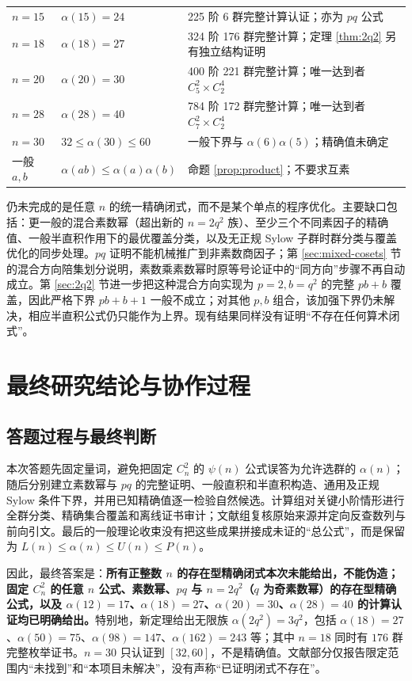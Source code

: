 \documentclass[11pt,a4paper]{article}
\numberwithin{equation}{section}
\theoremstyle{plain}
\theoremstyle{definition}
\theoremstyle{remark}
\begin{document}
\begin{center}
\begin{longtable}{p{}p{}p{}}
$n=15$ & $\alpha(15)=24$ & 225 阶 6 群完整计算认证；亦为 $pq$ 公式\\
$n=18$ & $\alpha(18)=27$ & 324 阶 176 群完整计算；定理 \ref{thm:2q2} 另有独立结构证明\\
$n=20$ & $\alpha(20)=30$ & 400 阶 221 群完整计算；唯一达到者 $C_5^2\times C_2^4$\\
$n=28$ & $\alpha(28)=40$ & 784 阶 172 群完整计算；唯一达到者 $C_7^2\times C_2^4$\\
$n=30$ & $32\le\alpha(30)\le60$ & 一般下界与 $\alpha(6)\alpha(5)$；精确值未确定\\
一般 $a,b$ & $\alpha(ab)\le\alpha(a)\alpha(b)$ & 命题 \ref{prop:product}；不要求互素\\
\bottomrule
\end{longtable}
\end{center}

仍未完成的是任意 $n$ 的统一精确闭式，而不是某个单点的程序优化。主要缺口包括：更一般的混合素数幂（超出新的 $n=2q^2$ 族）、至少三个不同素因子的精确值、一般半直积作用下的最优覆盖分类，以及无正规 Sylow 子群时群分类与覆盖优化的同步处理。$pq$ 证明不能机械推广到非素数商因子；第 \ref{sec:mixed-cosets} 节的混合方向陪集划分说明，素数乘素数幂时原等号论证中的“同方向”步骤不再自动成立。第 \ref{sec:2q2} 节进一步把这种混合方向实现为 $p=2,b=q^2$ 的完整 $pb+b$ 覆盖，因此严格下界 $pb+b+1$ 一般不成立；对其他 $p,b$ 组合，该加强下界仍未解决，相应半直积公式仍只能作为上界。现有结果同样没有证明“不存在任何算术闭式”。

\section{最终研究结论与协作过程}
\subsection{答题过程与最终判断}
本次答题先固定量词，避免把固定 $C_n^2$ 的 $\psi(n)$ 公式误答为允许选群的 $\alpha(n)$；随后分别建立素数幂与 $pq$ 的完整证明、一般直积和半直积构造、通用及正规 Sylow 条件下界，并用已知精确值逐一检验自然候选。计算组对关键小阶情形进行全群分类、精确集合覆盖和离线证书审计；文献组复核原始来源并定向反查数列与前向引文。最后的一般理论收束没有把这些成果拼接成未证的“总公式”，而是保留为 $L(n)\le\alpha(n)\le U(n)\le P(n)$。

因此，最终答案是：\textbf{所有正整数 $n$ 的存在型精确闭式本次未能给出，不能伪造；固定 $C_n^2$ 的任意 $n$ 公式、素数幂、$pq$ 与 $n=2q^2$（$q$ 为奇素数幂）的存在型精确公式，以及 $\alpha(12)=17$、$\alpha(18)=27$、$\alpha(20)=30$、$\alpha(28)=40$ 的计算认证均已明确给出。}特别地，新定理给出无限族 $\alpha(2q^2)=3q^2$，包括 $\alpha(18)=27$、$\alpha(50)=75$、$\alpha(98)=147$、$\alpha(162)=243$ 等；其中 $n=18$ 同时有 $176$ 群完整枚举证书。$n=30$ 只认证到 $[32,60]$，不是精确值。文献部分仅报告限定范围内“未找到”和“本项目未解决”，没有声称“已证明闭式不存在”。
\end{document}
